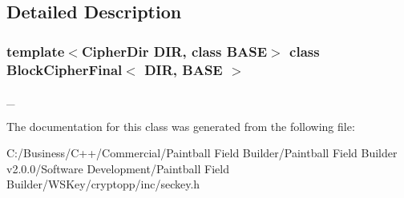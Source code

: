 \subsection{Detailed Description}
\subsubsection*{template$<$CipherDir DIR, class BASE$>$ class BlockCipherFinal$<$ DIR, BASE $>$}

\_\- 

The documentation for this class was generated from the following file:\begin{DoxyCompactItemize}
\item 
C:/Business/C++/Commercial/Paintball Field Builder/Paintball Field Builder v2.0.0/Software Development/Paintball Field Builder/WSKey/cryptopp/inc/seckey.h\end{DoxyCompactItemize}
